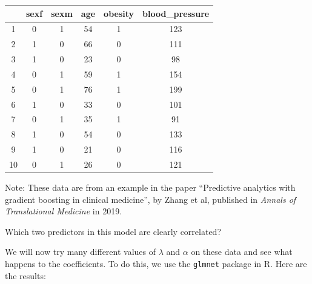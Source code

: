 {\small
\begin{center}
\begin{tabular}{cccccc}
  \toprule
 & sexf & sexm & age & obesity & blood\_pressure \\ 
  \midrule
  1 & 0 & 1 & 54 & 1 & 123 \\ 
  2 & 1 & 0 & 66 & 0 & 111 \\ 
  3 & 1 & 0 & 23 & 0 & 98 \\ 
  4 & 0 & 1 & 59 & 1 & 154 \\ 
  5 & 0 & 1 & 76 & 1 & 199 \\ 
  6 & 1 & 0 & 33 & 0 & 101 \\ 
  7 & 0 & 1 & 35 & 1 & 91 \\ 
  8 & 1 & 0 & 54 & 0 & 133 \\ 
  9 & 1 & 0 & 21 & 0 & 116 \\ 
  10 & 0 & 1 & 26 & 0 & 121 \\
  \bottomrule
\end{tabular}
\end{center}
}

Note: These data are from an example in the paper ``Predictive analytics with gradient boosting in clinical medicine'', by Zhang et al, published in \emph{Annals of Translational Medicine} in 2019.

\vspace{2mm}
\begin{question}{}
Which two predictors in this model are clearly correlated?
\end{question}

We will now try many different values of $\lambda$ and $\alpha$ on these data and see what happens to the coefficients. To do this, we use the \texttt{glmnet} package in R. Here are the results:

